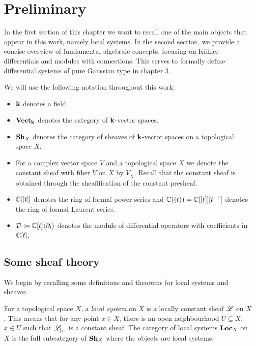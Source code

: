 \chapter{Preliminary}
In the first section of this chapter we want to recall one of the main objects that appear in this work, namely local systems. In the second section, we provide a concise overview of fundamental algebraic concepts, focusing on Kähler differentials and modules with connections. This serves to formally define differential systems of pure Gaussian type in chapter 3.
~\newline 

We will use the following notation throughout this work:
\begin{itemize}
    \item $\mathbf{k}$ denotes a field. 
    \item $\mathbf{Vect}_{\mathbf{k}}$ denotes the category of $\mathbf{k}$-vector spaces.
    \item $\mathbf{Sh}_X$ denotes the category of sheaves of $\mathbf{k}$-vector spaces on a topological space $X$.
    \item For a complex vector space $V$ and a topological space $X$ we denote the constant sheaf with fiber $V$ on $X$ by $\underline{V}_X$. Recall that the constant sheaf is obtained through the sheafification of the constant presheaf.
    \item $\mathbb{C}[[t]]$ denotes the ring of formal power series and $\mathbb{C}((t)) = \mathbb{C}[[t]][t^{-1}]$ denotes the ring of formal Laurent series.
    \item $\mathcal{D} \coloneqq \mathbb{C}[t]\langle \partial_t \rangle$ denotes the module of differential operators with coefficients in $\mathbb{C}[t]$.
\end{itemize} 

\section{Some sheaf theory}

We begin by recalling some definitions and theorems for local systems and sheaves.

\begin{defi} For a topological space $X$, a \emph{local system} on $X$ is a locally constant sheaf $\mathscr{L}$ on $X$. This means that for any point $x \in X$, there is an open neighbourhood $U \subseteq X$, $x \in U$ such that $\mathscr{L}_{\vert_U}$ is a constant sheaf.  The category of local systems $\mathbf{Loc}_X$ on $X$ is the full subcategory of $\mathbf{Sh}_X$ where the objects are local systems.
\end{defi}

